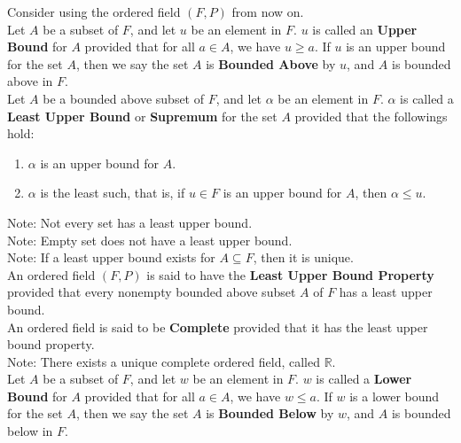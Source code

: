 \documentclass[11pt]{article}
\newcommand{\R}{\mathbb{R}}
\newcommand{\note}{\color{gray}Note: \color{black}}
\begin{document}
		

		\hfill\break
		\hfill\break
		\noindent \color{red} Consider using the ordered field $(F,P)$ from now on. \color{black} \\
	
		\noindent Let $A$ be a subset of $F$, and let $u$ be an element in $F$. $u$ is called an \textbf{Upper Bound} for $A$ provided that for all $a \in A$, we have $u \geq a$. If $u$ is an upper bound for the set $A$, then we say the set $A$ is \textbf{Bounded Above} by $u$, and $A$ is bounded above in $F$.\\
	
		\noindent Let $A$ be a bounded above subset of $F$, and let $\alpha$ be an element in $F$. $\alpha$ is called a \textbf{Least Upper Bound} or \textbf{Supremum} for the set $A$ provided that the followings hold:
		\begin{enumerate}[topsep=3pt,itemsep=-1ex,partopsep=1ex,parsep=1ex]
			\item $\alpha$ is an upper bound for $A$.
			\item $\alpha$ is the least such, that is, if $u \in F$ is an upper bound for $A$, then $\alpha \leq u$.
		\end{enumerate}
		\note Not every set has a least upper bound.\\
		\note Empty set does not have a least upper bound.\\
		\note If a least upper bound exists for $A \subseteq F$, then it is unique.\\
		
		\noindent An ordered field $(F,P)$ is said to have the \textbf{Least Upper Bound Property} provided that every nonempty bounded above subset $A$ of $F$ has a least upper bound.\\
		
		\noindent An ordered field is said to be \textbf{Complete} provided that it has the least upper bound property.\\
		\note There exists a unique complete ordered field, called $\R$.\\
		
		\noindent Let $A$ be a subset of $F$, and let $w$ be an element in $F$. $w$ is called a \textbf{Lower Bound} for $A$ provided that for all $a \in A$, we have $w \leq a$. If $w$ is a lower bound for the set $A$, then we say the set $A$ is \textbf{Bounded Below} by $w$, and $A$ is bounded below in $F$.\\
		
\end{document}
